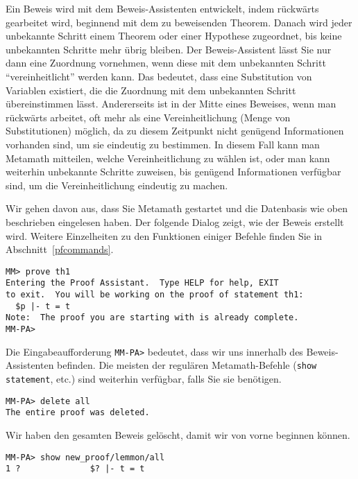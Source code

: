 Ein Beweis wird mit dem Beweis-Assistenten entwickelt, indem rückwärts gearbeitet wird, beginnend mit dem zu beweisenden Theorem. Danach wird jeder unbekannte Schritt einem Theorem oder einer Hypothese zugeordnet, bis keine unbekannten Schritte mehr übrig bleiben.  Der Beweis-Assistent lässt Sie nur dann eine Zuordnung vornehmen, wenn diese mit dem unbekannten Schritt "`vereinheitlicht"' werden kann.  Das bedeutet, dass eine Substitution von Variablen existiert, die die Zuordnung mit dem unbekannten Schritt übereinstimmen lässt.  Andererseits ist in der Mitte eines Beweises, wenn man rückwärts arbeitet, oft mehr als eine Vereinheitlichung (Menge von Substitutionen) möglich, da zu diesem Zeitpunkt nicht genügend Informationen vorhanden sind, um sie eindeutig zu bestimmen.  In diesem Fall kann man Metamath mitteilen, welche Vereinheitlichung zu wählen ist, oder man kann weiterhin unbekannte Schritte zuweisen, bis genügend Informationen verfügbar sind, um die Vereinheitlichung eindeutig zu machen.

Wir gehen davon aus, dass Sie Metamath gestartet und die Datenbasis wie oben beschrieben eingelesen haben.  Der folgende Dialog zeigt, wie der Beweis erstellt wird.  Weitere Einzelheiten zu den Funktionen einiger Befehle finden Sie in Abschnitt~\ref{pfcommands}. 

\begin{verbatim}
MM> prove th1
Entering the Proof Assistant.  Type HELP for help, EXIT
to exit.  You will be working on the proof of statement th1:
  $p |- t = t
Note:  The proof you are starting with is already complete.
MM-PA>
\end{verbatim}

Die Eingabeaufforderung \verb/MM-PA>/ bedeutet, dass wir uns innerhalb des Beweis-Assistenten befinden. Die meisten der regulären Metamath-Befehle (\texttt{show statement}, etc.) sind weiterhin verfügbar, falls Sie sie benötigen.

\begin{verbatim}
MM-PA> delete all
The entire proof was deleted.
\end{verbatim}

Wir haben den gesamten Beweis gelöscht, damit wir von vorne beginnen können.

\begin{verbatim}
MM-PA> show new_proof/lemmon/all
1 ?              $? |- t = t
\end{verbatim}

